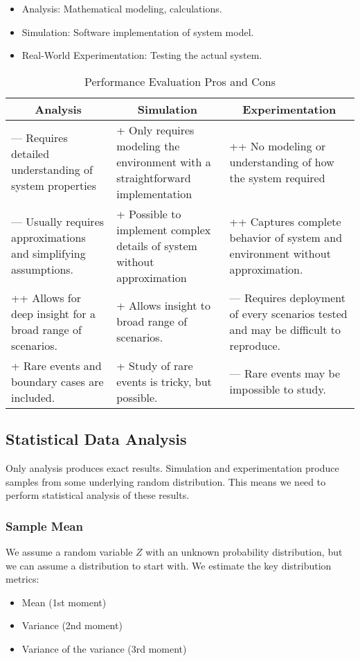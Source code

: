 \begin{itemize}[noitemsep]
\item Analysis: Mathematical modeling, calculations.
\item Simulation: Software implementation of system model.
\item Real-World Experimentation: Testing the actual system.
\end{itemize}

\begin{table}[h!]
  \centering
  \begin{tabular}{p{6cm}p{6cm}p{6cm}}
    \toprule
    \multicolumn{1}{c}{\textbf{Analysis}} & \multicolumn{1}{c}{\textbf{Simulation}} & \multicolumn{1}{c}{\textbf{Experimentation}} \\
    \midrule
    --- Requires detailed understanding of system properties & + Only requires modeling the environment with a straightforward implementation & ++ No modeling or understanding of how the system required \\
    \midrule
    --- Usually requires approximations and simplifying assumptions. & + Possible to implement complex details of system without approximation & ++ Captures complete behavior of system and environment without approximation. \\
    \midrule
    ++ Allows for deep insight for a broad range of scenarios. & + Allows insight to broad range of scenarios. & --- Requires deployment of every scenarios tested and may be difficult to reproduce. \\
    \midrule
    + Rare events and boundary cases are included. & + Study of rare events is tricky, but possible. & --- Rare events may be impossible to study. \\
    \bottomrule
  \end{tabular}
  \caption{Performance Evaluation Pros and Cons}
  \label{tab:Performance_Evaluation_Pros_Cons}
\end{table}

\subsection{Statistical Data Analysis}\label{subsec:Statistical_Data_Analysis}
Only analysis produces exact results.
Simulation and experimentation produce samples from some underlying random distribution.
This means we need to perform statistical analysis of these results.

\subsubsection{Sample Mean}\label{subsubsec:Sample_Mean}
We assume a random variable $Z$ with an unknown probability distribution, but we can assume a distribution to start with.
We estimate the key distribution metrics:
\begin{itemize}[noitemsep]
\item Mean (1st moment)
\item Variance (2nd moment)
\item Variance of the variance (3rd moment)
\end{itemize}

